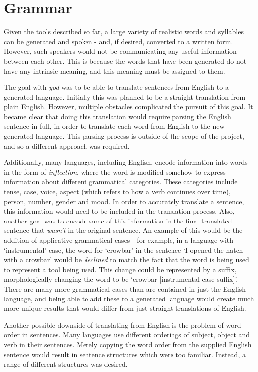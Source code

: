\documentclass{report}
\begin{document}
	\chapter{Grammar}
	
	Given the tools described so far, a large variety of realistic words and syllables can be generated and spoken - and, if desired, converted to a written form. However, such speakers would not be communicating any useful information between each other. This is because the words that have been generated do not have any intrinsic meaning, and this meaning must be assigned to them.
	
	The goal with \textit{yod} was to be able to translate sentences from English to a generated language. Initially this was planned to be a straight translation from plain English. However, multiple obstacles complicated the pursuit of this goal. It became clear that doing this translation would require parsing the English sentence in full, in order to translate each word from English to the new generated language. This parsing process is outside of the scope of the project, and so a different approach was required.
	
	Additionally, many languages, including English, encode information into words in the form of \textit{inflection}, where the word is modified somehow to express information about different grammatical categories. These categories include tense, case, voice, aspect (which refers to how a verb continues over time), person, number, gender and mood. In order to accurately translate a sentence, this information would need to be included in the translation process. Also, another goal was to encode some of this information in the final translated sentence that \textit{wasn't} in the original sentence. An example of this would be the addition of applicative grammatical cases - for example, in a language with `instrumental' case, the word for `crowbar' in the sentence `I opened the hatch with a crowbar' would be \textit{declined} to match the fact that the word is being used to represent a tool being used. This change could be represented by a suffix, morphologically changing the word to be `crowbar-[instrumental case suffix]'. There are many more grammatical cases than are contained in just the English language, and being able to add these to a generated language would create much more unique results that would differ from just straight translations of English.
	
	Another possible downside of translating from English is the problem of word order in sentences. Many languages use different orderings of subject, object and verb in their sentences\cite{wals-81}. Merely copying the word order from the supplied English sentence would result in sentence structures which were too familiar. Instead, a range of different structures was desired.
	
\end{document}
